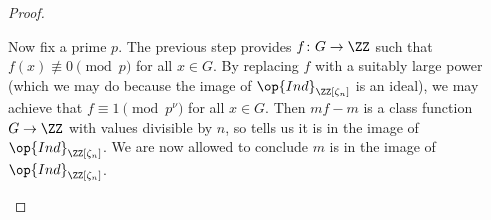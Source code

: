 \documentclass[../thesis.tex]{subfiles}
\begin{document}
\begin{proof}
\begin{enumerate}
		Now fix a prime $p$. The previous step provides $f\colon G\to\ZZ$ such that $f(x)\not\equiv0\pmod p$ for all $x\in G$. By replacing $f$ with a suitably large power (which we may do because the image of $\op{Ind}_{\ZZ[\zeta_n]}$ is an ideal), we may achieve that $f\equiv1\pmod{p^\nu}$ for all $x\in G$. Then $mf-m$ is a class function $G\to\ZZ$ with values divisible by $n$, so  tells us it is in the image of $\op{Ind}_{\ZZ[\zeta_n]}$. We are now allowed to conclude $m$ is in the image of $\op{Ind}_{\ZZ[\zeta_n]}$.
		\qedhere
	\end{enumerate}
\end{proof}

\end{document}
